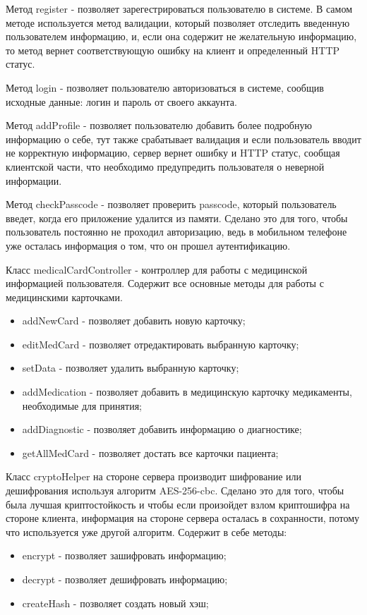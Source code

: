Метод register - позволяет зарегестрироваться пользователю в системе. В самом методе используется метод валидации, который позволяет отследить введенную пользователем информацию, и, если она содержит не желательную информацию, то метод вернет соответствующую ошибку на клиент и определенный HTTP статус.

Метод login - позволяет пользователю авторизоваться в системе, сообщив исходные данные: логин и пароль от своего аккаунта.

Метод addProfile - позволяет пользователю добавить более подробную информацию о себе, тут также срабатывает валидация и если пользователь вводит не корректную информацию, сервер вернет ошибку и HTTP статус, сообщая клиентской части, что необходимо предупредить пользователя о неверной информации.

Метод checkPasscode - позволяет проверить passcode, который пользователь введет, когда его приложение удалится из памяти. Сделано это для того, чтобы пользователь постоянно не проходил авторизацию, ведь в мобильном телефоне уже осталась информация о том, что он прошел аутентификацию.

Класс medicalCardController - контроллер для работы с медицинской информацией пользователя. Содержит все основные методы для работы с медицинскими карточками.

\begin{itemize}
  \item addNewCard - позволяет добавить новую карточку;
  \item editMedCard - позволяет отредактировать выбранную карточку;
  \item setData - позволяет удалить выбранную карточку;
  \item addMedication - позволяет добавить в медицинскую карточку медикаменты, необходимые для принятия;
  \item addDiagnostic - позволяет добавить информацию о диагностике;
  \item getAllMedCard - позволяет достать все карточки пациента;
\end{itemize}

Класс cryptoHelper на стороне сервера производит шифрование или дешифрования используя алгоритм AES-256-cbc. Сделано это для того, чтобы была лучшая криптостойкость и чтобы если произойдет взлом криптошифра на стороне клиента, информация на стороне сервера осталась в сохранности, потому что используется уже другой алгоритм. Содержит в себе методы:
\begin{itemize}
  \item encrypt - позволяет зашифровать информацию;
  \item decrypt - позволяет дешифровать информацию;
  \item createHash - позволяет создать новый хэш;
\end{itemize}

